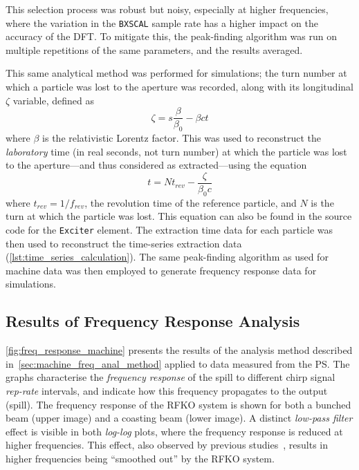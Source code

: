 \documentclass[a4paper,twoside,11pt]{report}
\begin{document}
This selection process was robust but noisy, especially at higher frequencies, where the variation in the \verb|BXSCAL| sample rate has a higher impact on the accuracy of the DFT. To mitigate this, the peak-finding algorithm was run on multiple repetitions of the same parameters, and the results averaged.

This same analytical method was performed for simulations; the turn number at which a particle was lost to the aperture was recorded, along with its longitudinal $\zeta$ variable, defined as
\begin{equation}
  \zeta = s \frac{\beta}{\beta_0} - \beta c t
\end{equation}
where $\beta$ is the relativistic Lorentz factor. This was used to reconstruct the \textit{laboratory} time (in real seconds, not turn number) at which the particle was lost to the aperture---and thus considered as extracted---using the equation
\begin{equation}
  t = N t_{rev} - \frac\zeta{\beta_0 c}
\end{equation}
where $t_{rev}=1/f_{rev}$, the revolution time of the reference particle, and $N$ is the turn at which the particle was lost. This equation can also be found in the source code for the \verb|Exciter| element. The extraction time data for each particle was then used to reconstruct the time-series extraction data (\autoref{lst:time_series_calculation}). The same peak-finding algorithm as used for machine data was then employed to generate frequency response data for simulations.


\subsection{Results of Frequency Response Analysis}
\autoref{fig:freq_response_machine} presents the results of the analysis method described in~\autoref{sec:machine_freq_anal_method} applied to data measured from the PS. The graphs characterise the \textit{frequency response} of the spill to different chirp signal \textit{rep-rate} intervals, and indicate how this frequency propagates to the output (spill). The frequency response of the RFKO system is shown for both a bunched beam (upper image) and a coasting beam (lower image). A distinct \textit{low-pass filter} effect is visible in both \textit{log-log} plots, where the frequency response is reduced at higher frequencies. This effect, also observed by previous studies~\cite{wepmp008,Pari:2780495}, results in higher frequencies being ``smoothed out'' by the RFKO system. 
\end{document}
